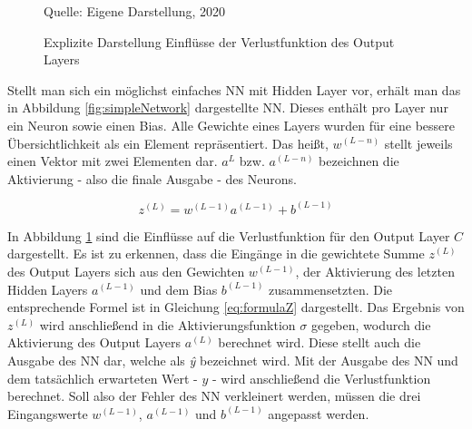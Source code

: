 \begin{figure}[t]
    \centering
    \caption[]{Explizite Darstellung Einflüsse der Verlustfunktion des Output Layers}
    \label{fig:unfoldedCost}
    Quelle: Eigene Darstellung, 2020
\end{figure}

Stellt man sich ein möglichst einfaches \ac{NN} mit Hidden Layer vor, erhält man das in Abbildung \ref{fig:simpleNetwork} dargestellte \ac{NN}. Dieses enthält pro Layer nur ein Neuron sowie einen Bias. Alle Gewichte eines Layers wurden für eine bessere Übersichtlichkeit als ein Element repräsentiert. Das heißt, $w^{(L-n)}$ stellt jeweils einen Vektor mit zwei Elementen dar. $a^{L}$ bzw. $a^{(L-n)}$ bezeichnen die Aktivierung - also die finale Ausgabe - des Neurons.

\begin{equation} \label{eq:formulaZ}
    z^{(L)} = w^{(L-1)} a^{(L-1)} + b^{(L-1)}
\end{equation}

In Abbildung \ref{fig:unfoldedCost} sind die Einflüsse auf die Verlustfunktion für den Output Layer $C$ dargestellt. Es ist zu erkennen, dass die Eingänge in die gewichtete Summe $z^{(L)}$ des Output Layers sich aus den Gewichten $w^{(L-1)}$, der Aktivierung des letzten Hidden Layers $a^{(L-1)}$ und dem Bias $b^{(L-1)}$ zusammensetzten. Die entsprechende Formel ist in Gleichung \ref{eq:formulaZ} dargestellt. Das Ergebnis von $z^{(L)}$ wird anschließend in die Aktivierungsfunktion $\sigma$ gegeben, wodurch die Aktivierung des Output Layers $a^{(L)}$ berechnet wird. Diese stellt auch die Ausgabe des \ac{NN} dar, welche als \textit{\^{y}} bezeichnet wird. Mit der Ausgabe des \ac{NN} und dem tatsächlich erwarteten Wert - $y$ - wird anschließend die Verlustfunktion berechnet. Soll also der Fehler des \ac{NN} verkleinert werden, müssen die drei Eingangswerte $w^{(L-1)}$, $a^{(L-1)}$ und $b^{(L-1)}$ angepasst werden. 

